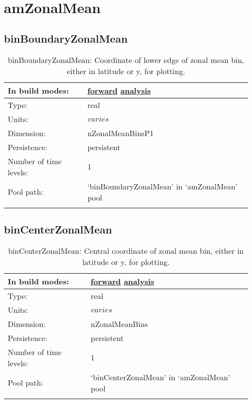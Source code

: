 \section[amZonalMean]{amZonalMean}
\label{sec:var_sec_amZonalMean}
\subsection[binBoundaryZonalMean]{binBoundaryZonalMean}
\label{subsec:var_sec_amZonalMean_binBoundaryZonalMean}
\begin{center}
\begin{longtable}{| p{2.0in} | p{4.0in} |}
        \hline 
        In build modes: & \hyperref[subsec:forward_var_tab_amZonalMean]{forward} \hyperref[subsec:analysis_var_tab_amZonalMean]{analysis} \\
        \hline 
        Type: & real \\
        \hline 
        Units: & $varies$ \\
        \hline 
        Dimension: & nZonalMeanBinsP1 \\
        \hline 
        Persistence: & persistent \\
        \hline 
        Number of time levels: & 1 \\
        \hline 
            Pool path: & `binBoundaryZonalMean' in `amZonalMean' pool \\
		 \hline 
    \caption{binBoundaryZonalMean: Coordinate of lower edge of zonal mean bin, either in latitude or y, for plotting.}
\end{longtable}
\end{center}
\subsection[binCenterZonalMean]{binCenterZonalMean}
\label{subsec:var_sec_amZonalMean_binCenterZonalMean}
\begin{center}
\begin{longtable}{| p{2.0in} | p{4.0in} |}
        \hline 
        In build modes: & \hyperref[subsec:forward_var_tab_amZonalMean]{forward} \hyperref[subsec:analysis_var_tab_amZonalMean]{analysis} \\
        \hline 
        Type: & real \\
        \hline 
        Units: & $varies$ \\
        \hline 
        Dimension: & nZonalMeanBins \\
        \hline 
        Persistence: & persistent \\
        \hline 
        Number of time levels: & 1 \\
        \hline 
            Pool path: & `binCenterZonalMean' in `amZonalMean' pool \\
		 \hline 
    \caption{binCenterZonalMean: Central coordinate of zonal mean bin, either in latitude or y, for plotting.}
\end{longtable}
\end{center}
